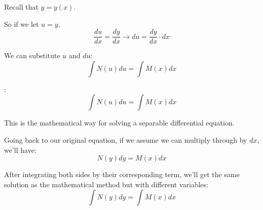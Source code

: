 \documentclass{book}
\begin{document}
Recall that \(y = y(x)\).

So if we let \(u = y\), \[\frac{du}{dx} = \frac{dy}{dx} \rightarrow {du} = \frac{dy}{dx} \cdot {dx}\]

We can substitute \(u\) and \({du}\):
\[\int N(u) {du} = \int M(x) {dx}\]

:
\[\int N(u) {du} = \int M(x) {dx}\]

This is the mathematical way for solving a separable differential equation.

Going back to our original equation, if we assume we can multiply through by \({dx}\), we'll have:
\[N(y) {dy} = M(x) {dx}\]

After integrating both sides by their corresponding term, we'll get the same solution as the mathematical method but with different variables:
\[\int N(y) {dy} = \int M(x) {dx}\]
\end{document}
